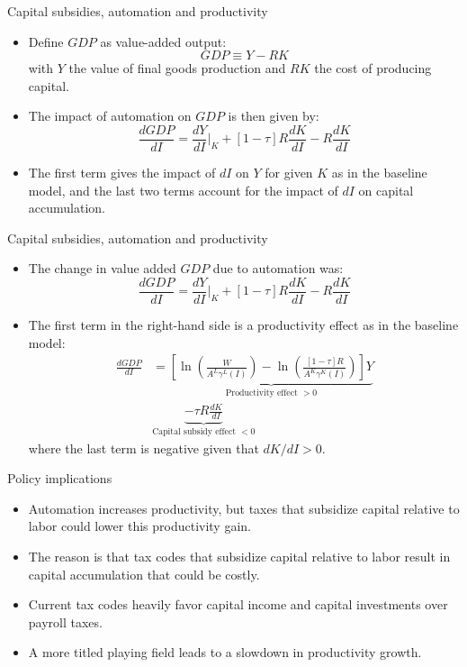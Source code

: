\documentclass[notes=show]{beamer}
\begin{document}
\begin{frame}{Capital subsidies, automation and productivity}
\begin{itemize}
\item Define $GDP$ as value-added output:
\[
GDP \equiv Y - RK
\]
with $Y$ the value of final goods production and $RK$ the cost of producing capital. \medskip
\item The impact of automation on $GDP$ is then given by:
\[
\frac{dGDP}{dI} = \frac{dY}{dI} |_{K} + [1-\tau]R \frac{dK}{dI} - R\frac{dK}{dI}
\]
\item The first term gives the impact of $dI$ on $Y$ for given $K$ as in the baseline model, and the last two terms account for the impact of $dI$ on capital accumulation.
\end{itemize}
\end{frame}

\begin{frame}{Capital subsidies, automation and productivity}
\begin{itemize}
\item The change in value added $GDP$ due to automation was:
\[
\frac{dGDP}{dI} = \frac{dY}{dI} |_{K} + [1-\tau]R \frac{dK}{dI} - R\frac{dK}{dI}
\]
\item The first term in the right-hand side is a productivity effect as in the baseline model:
\begin{align*}
\frac{dGDP}{dI} & = \underbrace{\left[ \ln \left( \frac{W}{A^{L}\gamma^{L}(I)} \right) - \ln \left( \frac{[1- \tau ]R}{A^{K}\gamma^{K}(I)} \right) \right]Y}_{\text{Productivity effect }>0} \\
& \underbrace{ -\tau R \frac{dK}{dI}}_{\text{Capital subsidy effect } <0}
\end{align*}
where the last term is negative given that $dK/dI >0$.
\end{itemize}
\end{frame}

\begin{frame}{Policy implications}
\begin{itemize}
\item Automation increases productivity, but taxes that subsidize capital relative to labor could lower this productivity gain. \medskip
\item The reason is that tax codes that subsidize capital relative to labor result in capital accumulation that could be costly. \medskip
\item Current tax codes heavily favor capital income and capital investments over payroll taxes. \medskip
\item A more titled playing field leads to a slowdown in productivity growth.
\end{itemize}
\end{frame}
\end{document}
